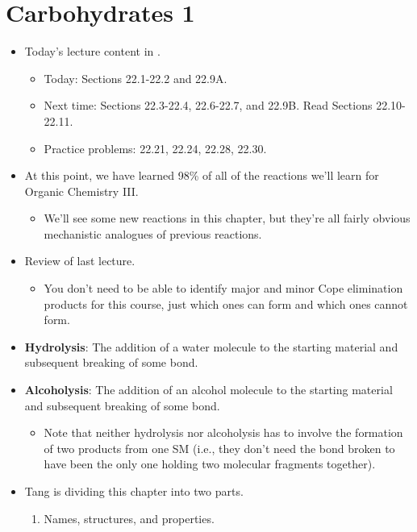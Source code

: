 \documentclass[../notes.tex]{subfiles}
\begin{document}
\section{Carbohydrates 1}
\begin{itemize}
    \item {}Today's lecture content in \textcite{bib:SolomonsEtAl}.
    \begin{itemize}
        \item Today: Sections 22.1-22.2 and 22.9A.
        \item Next time: Sections 22.3-22.4, 22.6-22.7, and 22.9B. Read Sections 22.10-22.11.
        \item Practice problems: 22.21, 22.24, 22.28, 22.30.
    \end{itemize}
    \item At this point, we have learned 98\% of all of the reactions we'll learn for Organic Chemistry III.
    \begin{itemize}
        \item We'll see some new reactions in this chapter, but they're all fairly obvious mechanistic analogues of previous reactions.
    \end{itemize}
    \item Review of last lecture.
    \begin{itemize}
        \item You don't need to be able to identify major and minor Cope elimination products for this course, just which ones can form and which ones cannot form.
    \end{itemize}
    \item \textbf{Hydrolysis}: The addition of a water molecule to the starting material and subsequent breaking of some bond.
    \item \textbf{Alcoholysis}: The addition of an alcohol molecule to the starting material and subsequent breaking of some bond.
    \begin{itemize}
        \item Note that neither hydrolysis nor alcoholysis has to involve the formation of two products from one SM (i.e., they don't need the bond broken to have been the only one holding two molecular fragments together).
    \end{itemize}
    \item Tang is dividing this chapter into two parts.
    \begin{enumerate}[label={\Roman*.}]
        \item Names, structures, and properties.

\end{enumerate}
\end{itemize}
\end{document}
